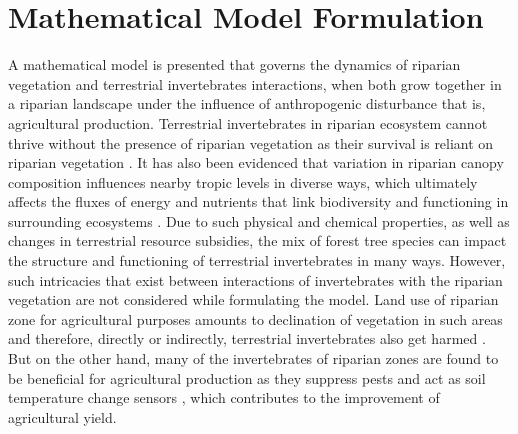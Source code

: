\documentclass[12pt]{article}
\numberwithin{equation}{section}
\begin{document}
\vspace{-1cm}
\section{Mathematical Model Formulation}
A mathematical model is presented that governs the dynamics of riparian vegetation and terrestrial invertebrates interactions, when both grow together in a riparian landscape under the influence of anthropogenic disturbance that is, agricultural production. Terrestrial invertebrates in riparian ecosystem cannot thrive without the presence of riparian vegetation as their survival is reliant on riparian vegetation \citep{popescu2021riparian, forio2020small, edwards1996effect, ramey2017terrestrial}.  It has also been evidenced that variation in riparian canopy composition influences nearby tropic levels in diverse ways, which ultimately affects the fluxes of energy and nutrients that link biodiversity and functioning in surrounding ecosystems \cite{kominoski2011}. Due to such physical and chemical properties, as well as changes in terrestrial resource subsidies, the mix of forest tree species can impact the structure and functioning of terrestrial invertebrates in many ways. However, such intricacies that exist between interactions of invertebrates with the riparian vegetation are not considered while formulating  the model. Land use of riparian zone for agricultural purposes amounts to declination of vegetation in such areas and therefore, directly or indirectly,  terrestrial invertebrates also get harmed \cite{popescu2021riparian}. But on the other hand, many of the invertebrates of riparian zones are found to be beneficial for agricultural production as they suppress pests \citep{krell2015aquatic, riis2020global, stockan2014effects, cole2012riparian} and act as soil temperature change sensors \cite{greenwood1995patial}, which contributes to the improvement of agricultural yield.\\
\end{document}
